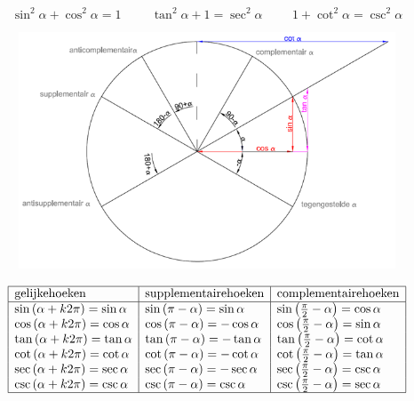 \documentclass[a5paper]{article}
\begin{document}
{\[
\boxed{\sin^2{\alpha} + \cos^2{\alpha} = 1} \hspace{1cm}
\boxed{\tan^2{\alpha} + 1 = \sec^2{\alpha}} \hspace{1cm}
\boxed{1 + \cot^2{\alpha} = \csc^2{\alpha}}
\]

\newpage
\begin{figure}
    \centering
    \includegraphics[width=1\linewidth]{image_goniometrie_verwante_hoeken.png}
  
    \label{fig:enter-label}
\end{figure}

\[
\begin{array}{|l|l|l|}
\hline
\text{gelijkehoeken} & \text{supplementairehoeken} & \text{complementairehoeken} \\
\hline
\sin{\left(\alpha + k2\pi\right)} = \sin{\alpha} & \sin{\left(\pi - \alpha\right)} = \sin{\alpha} & \sin{\left(\frac{\pi}{2} - \alpha\right)} = \cos{\alpha} \\
\cos{\left(\alpha + k2\pi\right)} = \cos{\alpha} & \cos{\left(\pi - \alpha\right)} = -\cos{\alpha} & \cos{\left(\frac{\pi}{2} - \alpha\right)} = \sin{\alpha} \\
\tan{\left(\alpha + k2\pi\right)} = \tan{\alpha} & \tan{\left(\pi - \alpha\right)} = -\tan{\alpha} & \tan{\left(\frac{\pi}{2} - \alpha\right)} = \cot{\alpha} \\
\cot{\left(\alpha + k2\pi\right)} = \cot{\alpha} & \cot{\left(\pi - \alpha\right)} = -\cot{\alpha} & \cot{\left(\frac{\pi}{2} - \alpha\right)} = \tan{\alpha} \\
\sec{\left(\alpha + k2\pi\right)} = \sec{\alpha} & \sec{\left(\pi - \alpha\right)} = -\sec{\alpha} & \sec{\left(\frac{\pi}{2} - \alpha\right)} = \csc{\alpha} \\
\csc{\left(\alpha + k2\pi\right)} = \csc{\alpha} & \csc{\left(\pi - \alpha\right)} = \csc{\alpha} & \csc{\left(\frac{\pi}{2} - \alpha\right)} = \sec{\alpha} \\
\hline
\end{array}
\]

}
\end{document}

